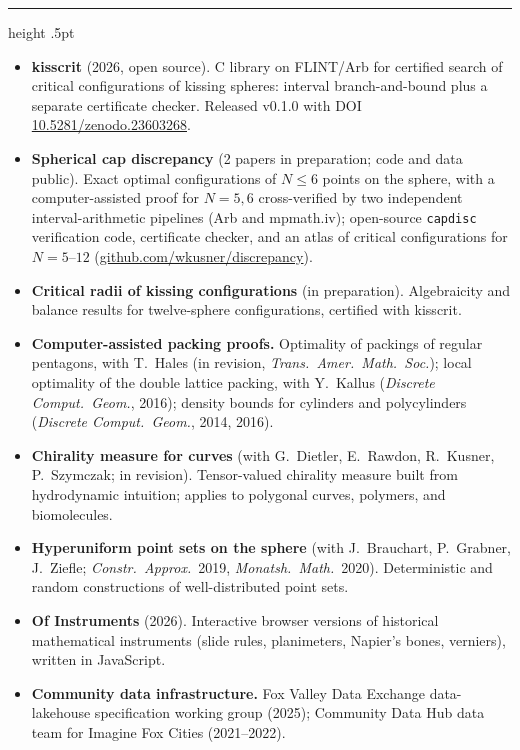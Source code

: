 \documentclass[11pt]{article}
\newcommand{\sect}[1]{\par\vspace{7pt}{\large\bfseries #1}\par\vspace{1pt}%
  {\color{rule}\hrule height .5pt}\vspace{4pt}}
\begin{document}
\sect{Selected Projects}
\begin{itemize}
  \item \textbf{kisscrit} (2026, open source). C library on FLINT/Arb for certified search of critical
        configurations of kissing spheres: interval branch-and-bound plus a separate certificate checker.
        Released v0.1.0 with DOI \href{https://doi.org/10.5281/zenodo.23603268}{10.5281/zenodo.23603268}.
  \item \textbf{Spherical cap discrepancy} (2 papers in preparation; code and data public). Exact optimal
        configurations of $N \le 6$ points on the sphere, with a computer-assisted proof for $N = 5, 6$
        cross-verified by two independent interval-arithmetic pipelines (Arb and mpmath.iv); open-source
        \texttt{capdisc} verification code, certificate checker, and an atlas of critical configurations
        for $N = 5$--$12$ (\href{https://github.com/wkusner/discrepancy}{github.com/wkusner/discrepancy}).
  \item \textbf{Critical radii of kissing configurations} (in preparation). Algebraicity and balance results
        for twelve-sphere configurations, certified with kisscrit.
  \item \textbf{Computer-assisted packing proofs.} Optimality of packings of regular pentagons, with T.~Hales
        (in revision, \emph{Trans.\ Amer.\ Math.\ Soc.}); local optimality of the double lattice packing,
        with Y.~Kallus (\emph{Discrete Comput.\ Geom.}, 2016); density bounds for cylinders and polycylinders
        (\emph{Discrete Comput.\ Geom.}, 2014, 2016).
  \item \textbf{Chirality measure for curves} (with G.~Dietler, E.~Rawdon, R.~Kusner, P.~Szymczak; in revision).
        Tensor-valued chirality measure built from hydrodynamic intuition; applies to polygonal curves,
        polymers, and biomolecules.
  \item \textbf{Hyperuniform point sets on the sphere} (with J.~Brauchart, P.~Grabner, J.~Ziefle;
        \emph{Constr.\ Approx.}\ 2019, \emph{Monatsh.\ Math.}\ 2020). Deterministic and random constructions of
        well-distributed point sets.
  \item \textbf{Of Instruments} (2026). Interactive browser versions of historical mathematical instruments
        (slide rules, planimeters, Napier's bones, verniers), written in JavaScript.
  \item \textbf{Community data infrastructure.} Fox Valley Data Exchange data-lakehouse specification working
        group (2025); Community Data Hub data team for Imagine Fox Cities (2021--2022).
\end{itemize}
\end{document}
